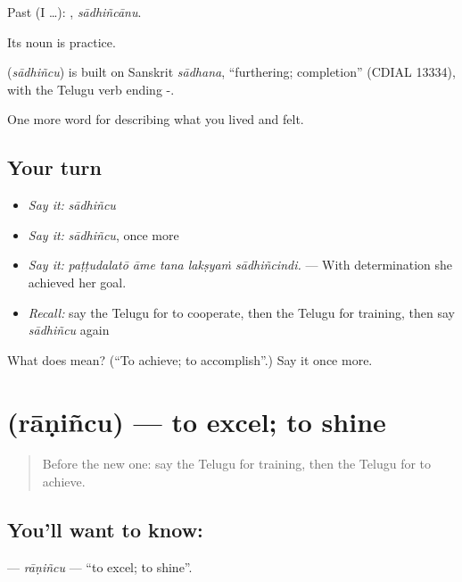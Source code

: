 Past (I …): , \emph{sādhiñcānu}.

Its noun  is practice.

\begin{cousinweb}
\textbf{} (\emph{sādhiñcu}) is built on Sanskrit \emph{sādhana}, \textquotedblleft{}furthering; completion\textquotedblright{} (CDIAL 13334), with the Telugu verb ending -.
\end{cousinweb}

\begin{grammarlens}[title={What you've built}]
One more word for describing what you lived and felt.
\end{grammarlens}

\subsection*{Your turn}
\begin{itemize}
\raggedright
  \item \emph{Say it:} \emph{sādhiñcu}
  \item \emph{Say it:} \emph{sādhiñcu}, once more
  \item \emph{Say it:} \emph{paṭṭudalatō āme tana lakṣyaṁ sādhiñcindi.} — With determination she achieved her goal.
  \item \emph{Recall:} say the Telugu for to cooperate, then the Telugu for training, then say \emph{sādhiñcu} again
\end{itemize}

\begin{tcolorbox}[breakable,colback=teal!4,colframe=teal!35!black,title={Before you move on}]
What does  mean? (\textquotedblleft{}To achieve; to accomplish\textquotedblright{}.) Say it once more.
\end{tcolorbox}
\section[\texorpdfstring{\te{రాణించు} (rāṇiñcu)}{రాణించు (rāṇiñcu)}]{ (rāṇiñcu) — to excel; to shine}

\label{lesson:TE-C527-ranincu}



\begin{quote}
Before the new one: say the Telugu for training, then the Telugu for to achieve.
\end{quote}

\subsection*{You'll want to know: }
\textbf{} — \emph{rāṇiñcu} — \textquotedblleft{}to excel; to shine\textquotedblright{}.

